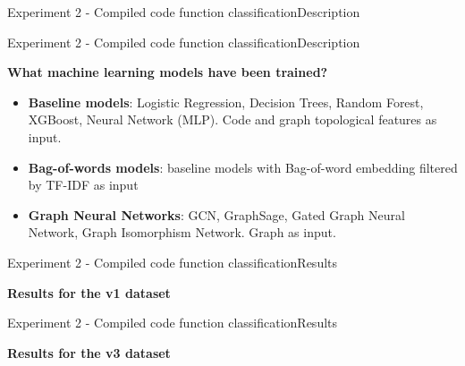\documentclass[xcolor=table]{beamer}
\begin{document}
\begin{frame}{Experiment 2 - Compiled code function classification}{Description}
\end{frame}



\begin{frame}{Experiment 2 - Compiled code function classification}{Description}

\textbf{What machine learning models have been trained?}
\begin{itemize}
    \item \textbf{Baseline models}: Logistic Regression, Decision Trees, Random Forest, XGBoost, Neural Network (MLP). Code and graph topological features as input.

    \item \textbf{Bag-of-words models}: baseline models with Bag-of-word embedding filtered by TF-IDF as input

    \item \textbf{Graph Neural Networks}: GCN, GraphSage, Gated Graph Neural Network, Graph Isomorphism Network. Graph as input.
\end{itemize}

\end{frame}


\begin{frame}{Experiment 2 - Compiled code function classification}{Results}



\textbf{Results for the v1 dataset}





\end{frame}


\begin{frame}{Experiment 2 - Compiled code function classification}{Results}


\textbf{Results for the v3 dataset}


\end{frame}
\end{document}
